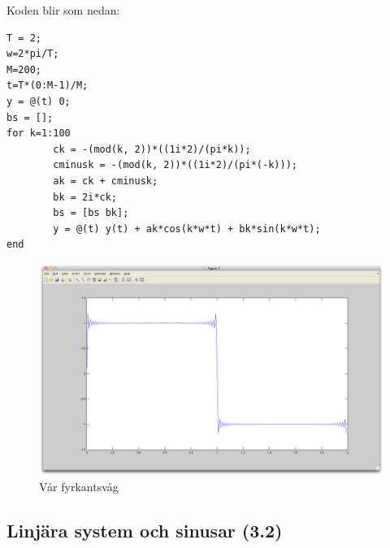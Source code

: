 \documentclass[]{article}
\begin{document}
Koden blir som nedan:

\begin{verbatim}
T = 2;
w=2*pi/T;
M=200;
t=T*(0:M-1)/M;
y = @(t) 0;
bs = [];
for k=1:100
		ck = -(mod(k, 2))*((1i*2)/(pi*k));
		cminusk = -(mod(k, 2))*((1i*2)/(pi*(-k)));
		ak = ck + cminusk;
		bk = 2i*ck;
		bs = [bs bk];
		y = @(t) y(t) + ak*cos(k*w*t) + bk*sin(k*w*t);
end
\end{verbatim}
\begin{figure}[htb]
  \centering
  \includegraphics[width=15.0cm]{square.png}
  \caption{Vår fyrkantsvåg}
\end{figure}

\subsection{Linjära system och sinusar (3.2)} %
\label{sub:linjära_system_och_sinusar_3_2_}



\end{document}
